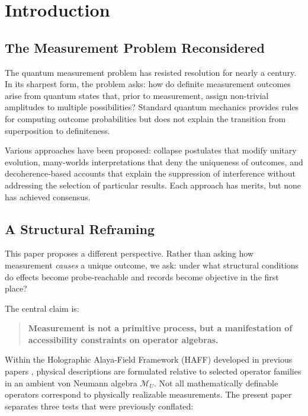 \documentclass[12pt,a4paper,openany]{book}
\begin{document}
\section{Introduction}
\label{E-sec:intro}

\subsection{The Measurement Problem Reconsidered}

The quantum measurement problem has resisted resolution for nearly a century. In its sharpest form, the problem asks: how do definite measurement outcomes arise from quantum states that, prior to measurement, assign non-trivial amplitudes to multiple possibilities? Standard quantum mechanics provides rules for computing outcome probabilities but does not explain the transition from superposition to definiteness.

Various approaches have been proposed: collapse postulates that modify unitary evolution, many-worlds interpretations that deny the uniqueness of outcomes, and decoherence-based accounts that explain the suppression of interference without addressing the selection of particular results. Each approach has merits, but none has achieved consensus.

\subsection{A Structural Reframing}

This paper proposes a different perspective. Rather than asking how measurement \emph{causes} a unique outcome, we ask: under what structural conditions do effects become probe-reachable and records become objective in the first place?

The central claim is:

\begin{quote}
\textbf{Measurement is not a primitive process, but a manifestation of accessibility constraints on operator algebras.}
\end{quote}

Within the Holographic Alaya-Field Framework (HAFF) developed in previous papers \cite{Liu2026PaperA,Liu2026PaperB,Liu2026PaperC,Liu2026PaperD}, physical descriptions are formulated relative to selected operator families in an ambient von Neumann algebra $\mathcal M_U$. Not all mathematically definable operators correspond to physically realizable measurements. The present paper separates three tests that were previously conflated:
\end{document}
